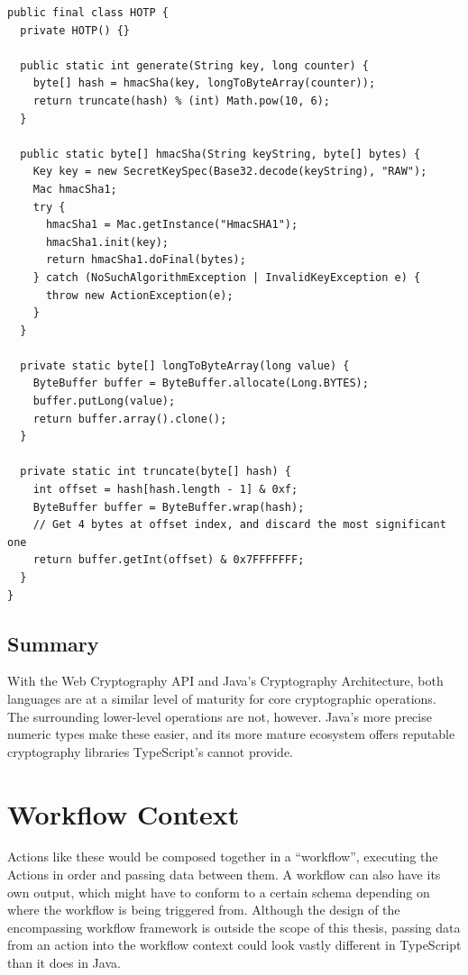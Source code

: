 \begin{listing}[H]
    \begin{verbatim}
public final class HOTP {
  private HOTP() {}
    
  public static int generate(String key, long counter) {
    byte[] hash = hmacSha(key, longToByteArray(counter));
    return truncate(hash) % (int) Math.pow(10, 6);
  }
    
  public static byte[] hmacSha(String keyString, byte[] bytes) {
    Key key = new SecretKeySpec(Base32.decode(keyString), "RAW");
    Mac hmacSha1;
    try {
      hmacSha1 = Mac.getInstance("HmacSHA1");
      hmacSha1.init(key);
      return hmacSha1.doFinal(bytes);
    } catch (NoSuchAlgorithmException | InvalidKeyException e) {
      throw new ActionException(e);
    }
  }
    
  private static byte[] longToByteArray(long value) {
    ByteBuffer buffer = ByteBuffer.allocate(Long.BYTES);
    buffer.putLong(value);
    return buffer.array().clone();
  }
    
  private static int truncate(byte[] hash) {
    int offset = hash[hash.length - 1] & 0xf;
    ByteBuffer buffer = ByteBuffer.wrap(hash);
    // Get 4 bytes at offset index, and discard the most significant one
    return buffer.getInt(offset) & 0x7FFFFFFF;
  }
}
    \end{verbatim}
    \caption{HOTP generator in Java}
\end{listing}

\subsection{Summary}
With the Web Cryptography API and Java's Cryptography Architecture, both languages are at a similar level of maturity for core cryptographic operations. The surrounding lower-level operations are not, however. Java's more precise numeric types make these easier, and its more mature ecosystem offers reputable cryptography libraries TypeScript's cannot provide.

\pagebreak
\section{Workflow Context}
Actions like these would be composed together in a ``workflow'', executing the Actions in order and passing data between them. A workflow can also have its own output, which might have to conform to a certain schema depending on where the workflow is being triggered from. Although the design of the encompassing workflow framework is outside the scope of this thesis, passing data from an action into the workflow context could look vastly different in TypeScript than it does in Java. 

